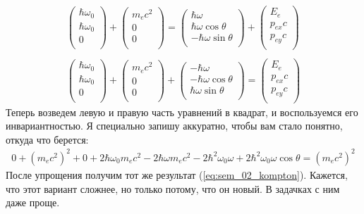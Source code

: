 \documentclass[12pt]{article}
\begin{document}
\begin{gather*}
    \left( \begin{matrix}
    \hbar\omega_0\\
    \hbar\omega_0\\
    0\\
    \end{matrix}
    \right) + 
    \left( \begin{matrix}
    m_ec^2\\
    0\\
    0\\
    \end{matrix}
    \right) =
    \left( \begin{matrix}
    \hbar\omega\\
    \hbar\omega \cos{\theta}\\
    -\hbar\omega \sin{\theta}\\
    \end{matrix}
    \right) + 
    \left( \begin{matrix}
    E_e\\
    p_{ex}c\\
    p_{ey}c\\
    \end{matrix}
    \right)\\
    \\
        \left( \begin{matrix}
    \hbar\omega_0\\
    \hbar\omega_0\\
    0\\
    \end{matrix}
    \right) + 
    \left( \begin{matrix}
    m_ec^2\\
    0\\
    0\\
    \end{matrix}
    \right)
    +\left( \begin{matrix}
    -\hbar\omega\\
    -\hbar\omega \cos{\theta}\\
    \hbar\omega \sin{\theta}\\
    \end{matrix}
    \right)=
    \left( \begin{matrix}
    E_e\\
    p_{ex}c\\
    p_{ey}c\\
    \end{matrix}
    \right)
\end{gather*}
Теперь возведем левую и правую часть уравнений в квадрат, и воспользуемся его инвариантностью. Я специально запишу аккуратно, чтобы вам стало понятно, откуда что берется:
\begin{gather*}
    0+(m_ec^2)^2 + 0 + 2\hbar\omega_0 m_ec^2 - 2\hbar\omega m_ec^2- 2\hbar^2\omega_0\omega + 2\hbar^2\omega_0\omega\cos{\theta} = (m_ec^2)^2
\end{gather*}
После упрощения получим тот же результат (\ref{eq:sem_02_kompton}). Кажется, что этот вариант сложнее, но только потому, что он новый. В задачках с ним даже проще.
\end{document}
